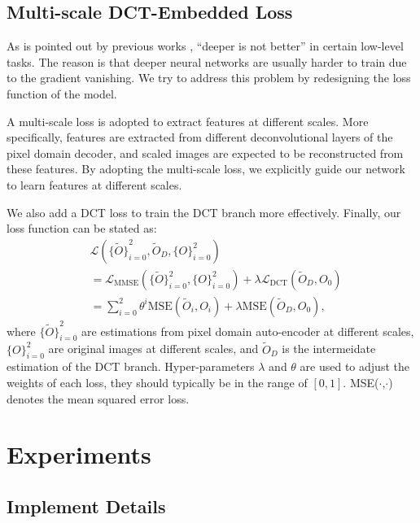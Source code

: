 \documentclass{article}
\begin{document}
\vspace{-0.3cm}
\subsection{Multi-scale DCT-Embedded Loss}
\label{ssec:mmse}

As is pointed out by previous works \cite{dong2014learning}
 \cite{dong2015compression}, ``deeper is not better'' in certain
low-level tasks. The reason is that deeper neural networks are usually harder
to train due to the gradient vanishing. We try to address this problem by
redesigning the loss function of the model.

A multi-scale loss is adopted to extract features at different scales.
More specifically, features are extracted from different
deconvolutional layers of the pixel domain decoder, and
scaled images are expected to be reconstructed from these features.
By adopting the multi-scale loss, we explicitly guide our network to learn
features at different scales. 

We also add a DCT loss to train the DCT branch more effectively. Finally,
our loss function can be stated as:
\begin{equation}
  \begin{aligned}
    &\mathcal{L}({\{\tilde O\}}_{i=0}^2,\tilde O_D , \{O\}_{i=0}^2) \\
    &= \mathcal{L}_{\text{MMSE}}(\{\tilde O\}_{i=0}^2, \{O\}_{i=0}^2)
    + \lambda \mathcal{L}_{\text{DCT}}(\tilde O_D , O_0) \\
    &= \sum_{i=0}^{2}{\theta^i\text{MSE}(\tilde O_i, O_i)} 
    + \lambda \text{MSE}(\tilde O_D, O_0),
  \end{aligned}
\end{equation}
where ${\{\tilde O\}}_{i=0}^2$ are estimations from pixel domain auto-encoder
at different scales, $\{O\}_{i=0}^2$ are original images at different scales,
and $\tilde O_D$ is the intermeidate estimation of the DCT branch.
Hyper-parameters $\lambda$ and $\theta$ are used to adjust the weights of
each loss, they should typically be in the range of $[0, 1]$.
MSE($\cdot$,$\cdot$) denotes the mean squared error loss.
\vspace{-0.2cm}

\section{Experiments}
\vspace{-0.1cm}
\label{sec:exp}
\subsection{Implement Details}
\label{ssec:detail}
\end{document}
